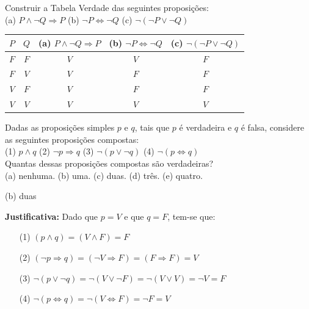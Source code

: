 \documentclass[12pt,letterpaper, onecolumn]{exam}
\begin{document}
\begin{questions}
    \question[q4] Construir a Tabela Verdade das seguintes proposições: \\[1em]
    (a) \( P \wedge \neg Q \Rightarrow P \) \hfill
    (b) \( \neg P \iff \neg Q \)            \hfill
    (c) \( \neg (\neg P \vee \neg Q) \)     

    \begin{solution}
        \begin{tabular}{| c | c || c | c | c |} 
         \hline
            \( P \) & \( Q \) &
            (a) \( P \wedge \neg Q \Rightarrow P \) &
            (b) \( \neg P \iff \neg Q \)  &
            (c) \( \neg (\neg P \vee \neg Q) \) \\
         \hline
         \hline
         \( F \) & \( F \) & \( V \) & \( V \) &  \( F \) \\
         \hline
         \( F \) & \( V \) & \( V \) & \( F \) &  \( F \) \\
         \hline
         \( V \) & \( F \) & \( V \) & \( F \) &  \( F \) \\
         \hline
         \( V \) & \( V \) & \( V \) & \( V \) &  \( V \) \\
         \hline
        \end{tabular}
    \end{solution}

    \pagebreak
    
    \question[q5] Dadas as proposições simples \(p\) e \(q\), tais que \(p\) é verdadeira e \(q\) é falsa, considere as seguintes proposições compostas: \\[1em] 
        (1) \( p \wedge q \) \hfill
        (2) \( \neg p \Rightarrow q \) \hfill
        (3) \( \neg ( p \vee \neg q ) \) \hfill
        (4) \( \neg ( p \iff q ) \) \\[1em] 
    Quantas dessas proposições compostas são verdadeiras? \\[1em]
        (a) nenhuma. \hfil
        (b) uma.     \hfil
        (c) duas.    \hfil
        (d) três.    \hfil
        (e) quatro.
    
    \begin{solution}
        (b) duas
        
        \textbf{Justificativa:}  Dado que \( p = V\) e que \( q = F \), tem-se que:
        
        \begin{itemize}
            \item[(1)] \( (p \wedge q) = (V \wedge F) = F\) 
            \item[(2)] \( (\neg p \Rightarrow q ) = ( \neg V \Rightarrow F ) = ( F \Rightarrow F ) = V\)
            \item[(3)] \( \neg ( p \vee \neg q ) = \neg ( V \vee \neg F ) = \neg ( V \vee V ) = \neg V = F \)
            \item[(4)] \( \neg ( p \iff q ) = \neg ( V \iff F ) = \neg F = V \)
        \end{itemize}


\end{solution}
\end{questions}
\end{document}
